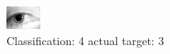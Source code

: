 \begin{figure}[h!]
\begin{center}
\includegraphics[width=0.60\columnwidth]{figures/ID1268_class_4_target_3.png}
\end{center}
\caption{ Classification: 4 actual target: 3}
\label{fig:ID1268_class_4_target_3}
\end{figure}
